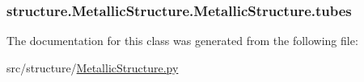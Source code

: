 \hypertarget{classstructure_1_1_metallic_structure_1_1_metallic_structure_aa6bb26a4671d3367dd85a9f257233ea6}{
\subsubsection[{tubes}]{\setlength{\rightskip}{0pt plus 5cm}structure.\-Metallic\-Structure.\-Metallic\-Structure.\-tubes}}\label{classstructure_1_1_metallic_structure_1_1_metallic_structure_aa6bb26a4671d3367dd85a9f257233ea6}


The documentation for this class was generated from the following file\-:\begin{DoxyCompactItemize}
\item 
src/structure/\hyperlink{_metallic_structure_8py}{Metallic\-Structure.\-py}\end{DoxyCompactItemize}
